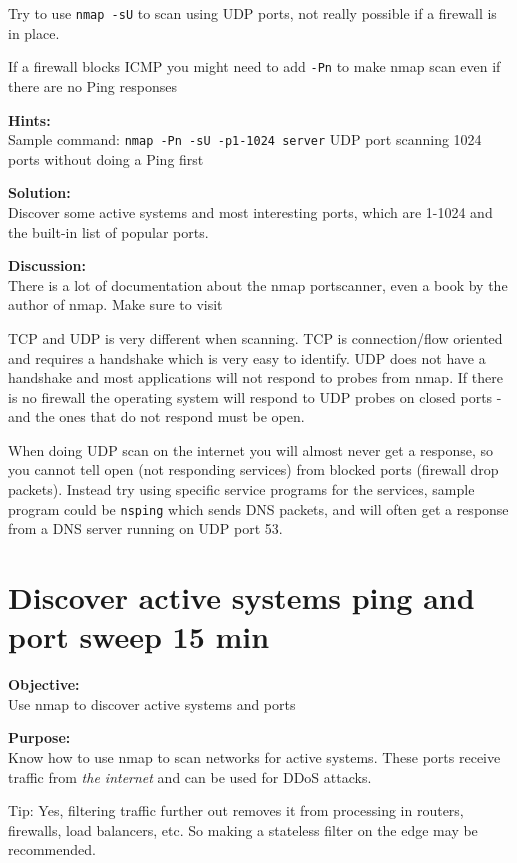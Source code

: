 \documentclass[a4paper,11pt,notitlepage]{report}
\begin{document}
Try to use \verb+nmap -sU+ to scan using UDP ports, not really possible if a firewall is in place.

If a firewall blocks ICMP you might need to add \verb+-Pn+ to make nmap scan even if there are no Ping responses

{\bf Hints:} \\
Sample command: \verb+nmap -Pn -sU -p1-1024 server+ UDP port scanning
1024 ports without doing a Ping first

{\bf Solution:}\\
Discover some active systems and most interesting ports, which are 1-1024 and the built-in list of popular ports.

{\bf Discussion:}\\
There is a lot of documentation about the nmap portscanner, even a book by the author
of nmap. Make sure to visit 

TCP and UDP is very different when scanning. TCP is connection/flow oriented and requires a handshake which is very easy to identify. UDP does not have a handshake and most applications will not respond to probes from nmap. If there is no firewall the operating system will respond to UDP probes on closed ports - and the ones that do not respond must be open.

When doing UDP scan on the internet you will almost never get a response, so you cannot tell open (not responding services) from blocked ports (firewall drop packets). Instead try using specific service programs for the services, sample program could be \verb+nsping+ which sends DNS packets, and will often get a response from a DNS server running on UDP port 53.


\chapter{Discover active systems ping and port sweep 15 min}
\label{ex:nmap-pingsweep}

{\bf Objective:}\\
Use nmap to discover active systems and ports

{\bf Purpose:}\\
Know how to use nmap to scan networks for active systems. These ports receive traffic from \emph{the internet} and can be used for DDoS attacks.

Tip: Yes, filtering traffic further out removes it from processing in routers, firewalls, load balancers, etc. So making a stateless filter on the edge may be recommended.
\end{document}
